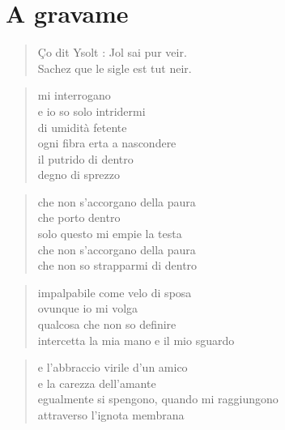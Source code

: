 \chapter*{A gravame}

\begin{verse}
    \begin{otherlanguage}{french}
        Ço dit Ysolt : Jol sai pur veir.\\
        Sachez que le sigle est tut neir.
    \end{otherlanguage}
\end{verse}


\begin{verse}
    mi interrogano\\
    e io so solo intridermi\\
    di umidità fetente\\
    ogni fibra erta a nascondere\\
    il putrido di dentro\\
    degno di sprezzo
\end{verse}

\begin{verse}
    che non s’accorgano della paura\\
    che porto dentro\\
    solo questo mi empie la testa\\
    che non s’accorgano della paura\\
    che non so strapparmi di dentro
\end{verse}

\clearpage


\begin{verse}
    impalpabile come velo di sposa\\
    ovunque io mi volga\\
    qualcosa che non so definire\\
    intercetta la mia mano e il mio sguardo
\end{verse}

\begin{verse}
    e l'abbraccio virile d'un amico\\
    e la carezza dell'amante\\
    egualmente si spengono, quando mi raggiungono\\
    attraverso l'ignota membrana
\end{verse}

